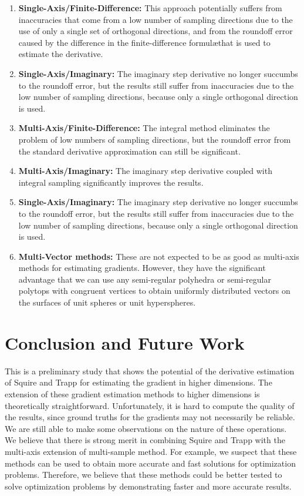 \documentclass{article}
\begin{document}
\begin{enumerate}
\item \textbf{Single-Axis/Finite-Difference:} This approach potentially suffers from inaccuracies that come from a low number of sampling directions due to the use of only a single set of orthogonal directions, and from the roundoff error caused by the difference in the finite-difference formul\ae that is used to estimate the derivative.    
\item \textbf{Single-Axis/Imaginary:}   The imaginary step derivative no longer succumbs to the roundoff error, but the results still suffer from inaccuracies due to the low number of sampling directions, because only a single orthogonal direction is used.
\item \textbf{Multi-Axis/Finite-Difference:} The integral method eliminates the problem of low numbers of sampling directions, but the roundoff error from the standard derivative approximation can still be significant.    
\item \textbf{Multi-Axis/Imaginary:}  The imaginary step derivative coupled with integral sampling significantly improves the results.
\item \textbf{Single-Axis/Imaginary:}   The imaginary step derivative no longer succumbs to the roundoff error, but the results still suffer from inaccuracies due to the low number of sampling directions, because only a single orthogonal direction is used.
\item \textbf{Multi-Vector methods:} These are not expected to be as good as multi-axis methods for estimating gradients. However, they have the significant advantage that we can use any semi-regular polyhedra or semi-regular polytops with congruent vertices to obtain uniformly distributed vectors on the surfaces of unit spheres or unit hyperspheres.  
\end{enumerate}

\section{Conclusion and Future Work}

This is a preliminary study that shows the potential of the derivative estimation of Squire and Trapp for estimating the gradient in higher dimensions. The extension of these gradient estimation methods to higher dimensions is theoretically straightforward. Unfortunately, it is hard to compute the quality of the results, since ground truths for the gradients may not necessarily be reliable. We are still able to make some observations on the nature of these operations. We believe that there is strong merit in combining Squire and Trapp with the multi-axis extension of multi-sample method\cite{hart1989}. For example, we suspect that these methods can be used to obtain more accurate and fast solutions for optimization problems. Therefore, we believe that these methods could be better tested to solve optimization problems by demonstrating faster and more accurate results. 
\end{document}
